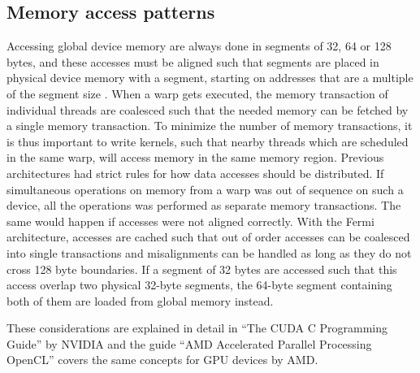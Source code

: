\subsection{Memory access patterns}
Accessing global device memory are always done in segments of 32, 64
or 128 bytes, and these accesses must be aligned such that segments
are placed in physical device memory with a segment, starting on
addresses that are a multiple of the segment size
\cite{nvidia2010cudaguide}. When a warp gets executed, the memory
transaction of individual threads are coalesced such that the
needed memory can be fetched by a single memory transaction. To
minimize the number of memory transactions, it is thus important to
write kernels, such that nearby threads which are scheduled in the
same warp, will access memory in the same memory region. Previous
architectures had strict rules for how data accesses should be
distributed. If simultaneous operations on memory from a warp was out
of sequence on such a device, all the operations was performed as
separate memory transactions. The same would happen if accesses were
not aligned correctly. With the Fermi architecture, accesses are
cached such that out of order accesses can be coalesced into single
transactions and misalignments can be handled as long as they do not
cross 128 byte boundaries. If a segment of 32 bytes are accessed such
that this access overlap two physical 32-byte segments, the 64-byte
segment containing both of them are loaded from global memory instead.

These considerations are explained in detail in ``The CUDA C
Programming Guide'' by NVIDIA \cite{nvidia2010cudaguide} and the guide
``AMD Accelerated Parallel Processing OpenCL\texttrademark''
\cite{amd2011opencl} covers the same concepts for GPU devices by AMD.


